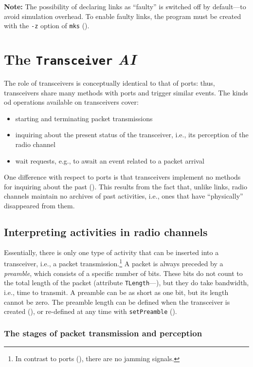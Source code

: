 \medskip

\noindent
{\bf Note:}
The possibility of declaring links as ``faulty'' is switched off by default---to
avoid simulation overhead.
To enable faulty links, the program must be created with the {\tt -z}
option of {\tt mks} ().
\section{The {\tt Transceiver} {\em AI\/}}
\label{rm_tr}

The role of transceivers is conceptually identical to that of ports: thus,
transceivers share many methods with ports and trigger similar events.
The kinds od operations available on transceivers cover:
\begin{itemize}
\item
starting and terminating packet transmissions
\item
inquiring about the present status of the transceiver, i.e., its perception of
the radio channel
\item
wait requests, e.g., to await an event related to a packet arrival
\end{itemize}

One difference with respect to ports is that transceivers implement no methods
for inquiring about the past ().
This results from the fact that, unlike links, radio channels maintain no
archives of past activities, i.e., ones that have ``physically''
disappeared from them.

\subsection{Interpreting activities in radio channels}
\label{rm_tr_ra}

Essentially, there is only one type of activity that can be inserted into
a transceiver, i.e., a packet transmission.\footnote{In contrast to ports
(), there are no jamming signals.}
A packet is always preceded by a {\em preamble}, which consists of a specific
number of bits.
These bits do not count to the total length of the packet (attribute
{\tt TLength}---), but they do take bandwidth, i.e.,
time to transmit.
A preamble can be as short as one bit, but its length cannot be zero.
The preamble length can be defined when the transceiver is created
(), or re-defined at any time with {\tt setPreamble}
().

\subsubsection{The stages of packet transmission and perception}
\label{rm_tr_ra_ps}

